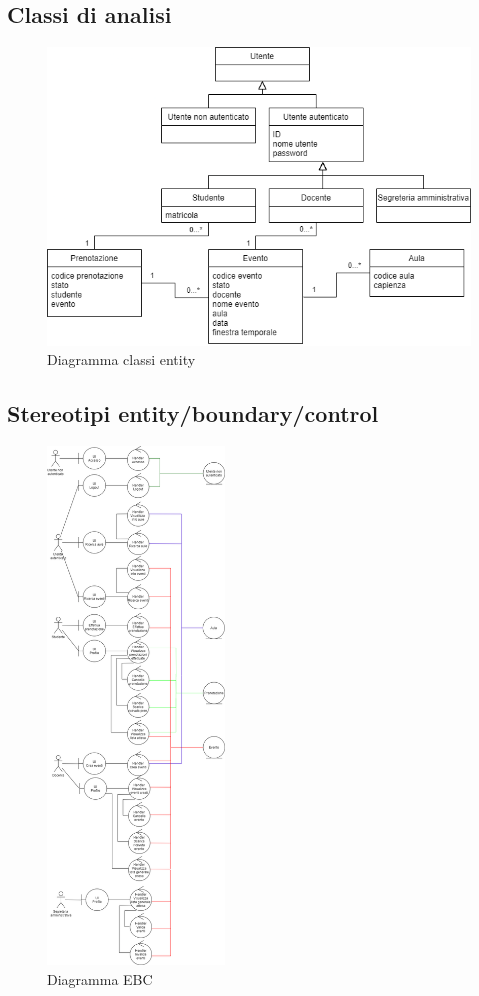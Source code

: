 \documentclass[11pt]{article}
\begin{document}
\newpage

\subsection{Classi di analisi}
\begin{figure}[H]
\centering
\includegraphics[width=1\textwidth]{Diagramma classi entity.png}
\caption{Diagramma classi entity}
\end{figure}

\subsection{Stereotipi entity/boundary/control}
\begin{figure}[H]
\centering
\includegraphics[width=0.42\textwidth]{Diagramma EBC.png}
\caption{Diagramma EBC}
\end{figure}
\end{document}
